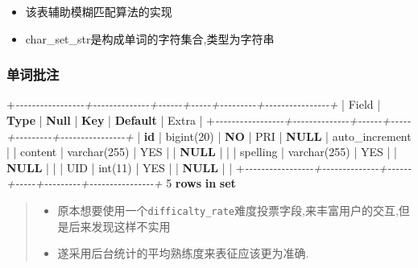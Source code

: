 \documentclass[
]{article}
\newenvironment{Shaded}{}{}
\newcommand{\CommentTok}[1]{\textcolor[rgb]{0.38,0.63,0.69}{\textit{#1}}}
\newcommand{\DataTypeTok}[1]{\textcolor[rgb]{0.56,0.13,0.00}{#1}}
\newcommand{\DecValTok}[1]{\textcolor[rgb]{0.25,0.63,0.44}{#1}}
\newcommand{\FunctionTok}[1]{\textcolor[rgb]{0.02,0.16,0.49}{#1}}
\newcommand{\KeywordTok}[1]{\textcolor[rgb]{0.00,0.44,0.13}{\textbf{#1}}}
\newcommand{\NormalTok}[1]{#1}
\newcommand{\OperatorTok}[1]{\textcolor[rgb]{0.40,0.40,0.40}{#1}}
\begin{document}
\begin{itemize}
\item
  该表辅助模糊匹配算法的实现
\item
  char\_set\_str是构成单词的字符集合,类型为字符串
\end{itemize}

\hypertarget{ux5355ux8bcdux6279ux6ce8}{%
\subsubsection{单词批注}\label{ux5355ux8bcdux6279ux6ce8}}

\begin{Shaded}
\begin{Highlighting}[]
\OperatorTok{+}\CommentTok{{-}{-}{-}{-}{-}{-}{-}{-}{-}{-}{-}{-}{-}{-}{-}{-}{-}+{-}{-}{-}{-}{-}{-}{-}{-}{-}{-}{-}{-}{-}{-}+{-}{-}{-}{-}{-}{-}+{-}{-}{-}{-}{-}+{-}{-}{-}{-}{-}{-}{-}{-}{-}+{-}{-}{-}{-}{-}{-}{-}{-}{-}{-}{-}{-}{-}{-}{-}{-}+}
\NormalTok{| Field           | }\KeywordTok{Type}\NormalTok{         | }\KeywordTok{Null}\NormalTok{ | }\KeywordTok{Key}\NormalTok{ | }\KeywordTok{Default}\NormalTok{ | Extra          |}
\OperatorTok{+}\CommentTok{{-}{-}{-}{-}{-}{-}{-}{-}{-}{-}{-}{-}{-}{-}{-}{-}{-}+{-}{-}{-}{-}{-}{-}{-}{-}{-}{-}{-}{-}{-}{-}+{-}{-}{-}{-}{-}{-}+{-}{-}{-}{-}{-}+{-}{-}{-}{-}{-}{-}{-}{-}{-}+{-}{-}{-}{-}{-}{-}{-}{-}{-}{-}{-}{-}{-}{-}{-}{-}+}
\NormalTok{| }\KeywordTok{id}\NormalTok{              | bigint(}\DecValTok{20}\NormalTok{)   | }\KeywordTok{NO}\NormalTok{   | PRI | }\KeywordTok{NULL}\NormalTok{    | auto\_increment |}
\NormalTok{| content         | }\DataTypeTok{varchar}\NormalTok{(}\DecValTok{255}\NormalTok{) | YES  |     | }\KeywordTok{NULL}\NormalTok{    |                |}
\NormalTok{| spelling        | }\DataTypeTok{varchar}\NormalTok{(}\DecValTok{255}\NormalTok{) | YES  |     | }\KeywordTok{NULL}\NormalTok{    |                |}
\NormalTok{| }\FunctionTok{UID}\NormalTok{             | }\DataTypeTok{int}\NormalTok{(}\DecValTok{11}\NormalTok{)      | YES  |     | }\KeywordTok{NULL}\NormalTok{    |                |}
\OperatorTok{+}\CommentTok{{-}{-}{-}{-}{-}{-}{-}{-}{-}{-}{-}{-}{-}{-}{-}{-}{-}+{-}{-}{-}{-}{-}{-}{-}{-}{-}{-}{-}{-}{-}{-}+{-}{-}{-}{-}{-}{-}+{-}{-}{-}{-}{-}+{-}{-}{-}{-}{-}{-}{-}{-}{-}+{-}{-}{-}{-}{-}{-}{-}{-}{-}{-}{-}{-}{-}{-}{-}{-}+}
\DecValTok{5} \KeywordTok{rows} \KeywordTok{in} \KeywordTok{set}
\end{Highlighting}
\end{Shaded}

\begin{quote}
\begin{itemize}
\item
  原本想要使用一个\texttt{difficalty\_rate}难度投票字段,来丰富用户的交互,但是后来发现这样不实用
\item
  遂采用后台统计的平均熟练度来表征应该更为准确.
\end{itemize}
\end{quote}
\end{document}

